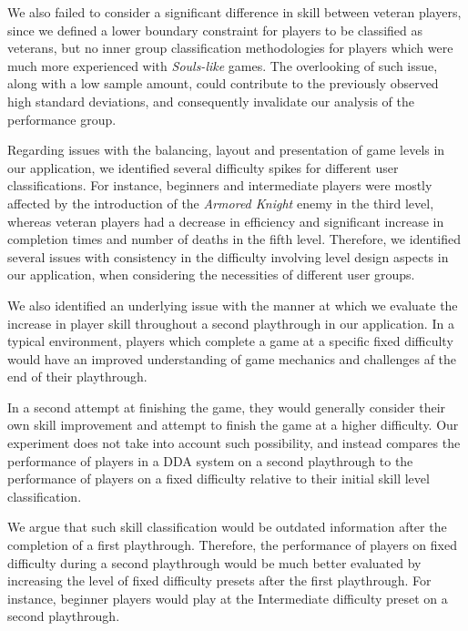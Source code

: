 We also failed to consider a significant difference in skill between veteran players, since we defined a lower boundary constraint for players to be classified as veterans, but no inner group classification methodologies for players which were much more experienced with \emph{Souls-like} games. The overlooking of such issue, along with a low sample amount, could contribute to the previously observed high standard deviations, and consequently invalidate our analysis of the performance group.

Regarding issues with the balancing, layout and presentation of game levels in our application, we identified several difficulty spikes for different user classifications. For instance, beginners and intermediate players were mostly affected by the introduction of the \emph{Armored Knight} enemy in the third level, whereas veteran players had a decrease in efficiency and significant increase in completion times and number of deaths in the fifth level. Therefore, we identified several issues with consistency in the difficulty involving level design aspects in our application, when considering the necessities of different user groups.

We also identified an underlying issue with the manner at which we evaluate the increase in player skill throughout a second playthrough in our application. In a typical environment, players which complete a game at a specific fixed difficulty would have an improved understanding of game mechanics and challenges af the end of their playthrough.

In a second attempt at finishing the game, they would generally consider their own skill improvement and attempt to finish the game at a higher difficulty. Our experiment does not take into account such possibility, and instead compares the performance of players in a DDA system on a second playthrough to the performance of players on a fixed difficulty relative to their initial skill level classification.

We argue that such skill classification would be outdated information after the completion of a first playthrough. Therefore, the performance of players on fixed difficulty during a second playthrough would be much better evaluated by increasing the level of fixed difficulty presets after the first playthrough. For instance, beginner players would play at the Intermediate difficulty preset on a second playthrough.

